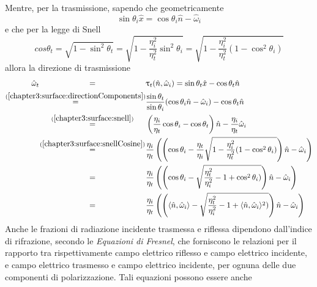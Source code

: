 Mentre, per la trasmissione, sapendo che geometricamente 
\begin{equation}\label{chapter3:surface:directionComponents}
	\sin\theta_i\hat{x} = \cos\theta_i\hat{n} - \hat{\omega}_i
\end{equation}
e che per la legge di Snell
\begin{equation}\label{chapter3:surface:snellCosine}
	cos\theta_t = \sqrt{1-\sin^2\theta_t} = \sqrt{1-\frac{\eta_i^2}{\eta_t^2}\sin^2\theta_i} = \sqrt{1-\frac{\eta_i^2}{\eta_t^2}(1-\cos^2\theta_i)}
\end{equation}
allora la direzione di trasmissione
{
	\newcommand{\dotprr}{\langle\hat{n},\hat{\omega}_i\rangle}
	\newcommand{\eq}{\mathmakebox[\widthof{(\ref{chapter3:surface:snellCosine})}]{=}}
	\begin{align}
		\hat{\omega}_t \eq& \uptau_t(\hat{n},\hat{\omega}_i) = \sin\theta_t\hat{x} - \cos\theta_t\hat{n} \\ 
			\stackrel{(\ref{chapter3:surface:directionComponents})}{\eq}&%
				\frac{\sin\theta_t}{\sin\theta_i}(\cos\theta_i\hat{n}-\hat{\omega}_i)-\cos\theta_t\hat{n} \nonumber \\
			\stackrel{(\ref{chapter3:surface:snell})}{\eq}&%
				\left(\frac{\eta_i}{\eta_t}\cos\theta_i -\cos\theta_t\right)\hat{n}-\frac{\eta_i}{\eta_t}\hat{\omega}_i \nonumber \\
			\stackrel{(\ref{chapter3:surface:snellCosine})}{\eq}& \frac{\eta_i}{\eta_t}\left(\left(\cos\theta_i%
				-\frac{\eta_t}{\eta_i}\sqrt{1-\frac{\eta_i^2}{\eta_t^2}(1-\cos^2\theta_i)}\right)\hat{n}-\hat{\omega}_i\right)\nonumber \\
			\eq& \frac{\eta_i}{\eta_t}\left(\left(\cos\theta_i-\sqrt{\frac{\eta_t^2}{\eta_i^2}-1+\cos^2\theta_i)}\right)\hat{n}-\hat{\omega}_i\right)%
				\nonumber \\
			\eq& \frac{\eta_i}{\eta_t}\left(\left(\dotprr -\sqrt{\frac{\eta_t^2}{\eta_i^2}-1+\dotprr^2)}\right)\hat{n}-\hat{\omega}_i\right)
	\end{align}
}
Anche le frazioni di radiazione incidente trasmessa e riflessa dipendono dall'indice di rifrazione, secondo le \textit{Equazioni di Fresnel}, che 
forniscono le relazioni per il rapporto tra rispettivamente campo elettrico riflesso e campo elettrico incidente, e campo elettrico trasmesso 
e campo elettrico incidente, per ognuna delle due componenti di polarizzazione\footnotemark{}. Tali equazioni possono essere anche 
